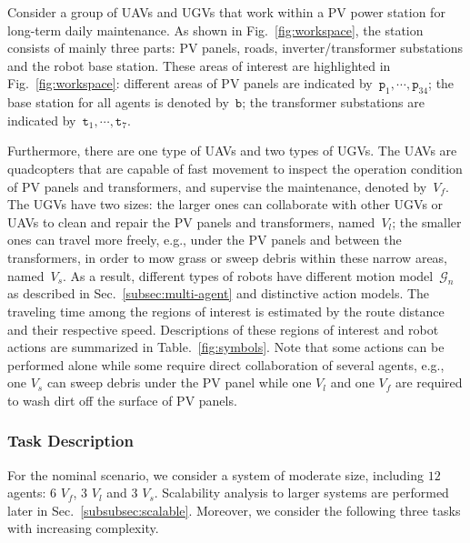 Consider a group of UAVs and UGVs that work within a PV power station for
long-term daily maintenance.
As shown in Fig.~\ref{fig:workspace},
the station consists of mainly three parts: PV panels, roads,
inverter/transformer substations and the robot base station.
These areas of interest are highlighted in Fig.~\ref{fig:workspace}:
different areas of PV panels are indicated by~$\texttt{p}_1,\cdots,\texttt{p}_{34}$;
the base station for all agents is denoted by~$\texttt{b}$;
the transformer substations are indicated by~$\texttt{t}_1,\cdots,\texttt{t}_7$.

Furthermore, there are one type of UAVs and two types of UGVs.
The UAVs are quadcopters that are capable of fast movement
to inspect the operation condition of PV panels and transformers,
and supervise the maintenance, denoted by~$V_f$.
The UGVs have two sizes: the larger ones can collaborate with other UGVs or UAVs
to clean and repair the PV panels and transformers, named~$V_l$;
the smaller ones can travel more freely, e.g., under the PV panels and between
the transformers,
in order to mow grass or sweep debris within these narrow areas, named~$V_s$.
As a result, different types of robots have different motion
model~$\mathcal{G}_n$ as described in Sec.~\ref{subsec:multi-agent}
and distinctive action models.
The traveling time among the regions of interest is estimated by the route
distance and their respective speed.
Descriptions of these regions of interest and robot actions are summarized in
Table.~\ref{fig:symbols}.
Note that some actions can be performed alone while some require direct
collaboration of several agents,
e.g., one $V_s$ can sweep debris under the PV panel while one $V_l$
and one $V_f$ are required to wash dirt off the surface of PV panels.



\subsubsection{Task Description}\label{subsubsec:task}

For the nominal scenario, we consider a system of moderate size,
including $12$ agents: 6 $V_f$, 3 $V_l$ and 3 $V_s$.
Scalability analysis to larger systems are performed later in Sec.~\ref{subsubsec:scalable}.
Moreover, we consider the following three tasks with increasing complexity.



